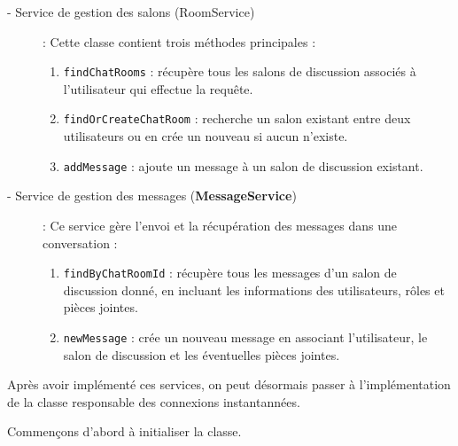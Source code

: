 \begin{description}
    \item[- Service de gestion des salons (RoomService)] : Cette classe contient trois méthodes principales :
        \begin{enumerate}
            \item \verb|findChatRooms| : récupère tous les salons de discussion associés à l'utilisateur qui effectue la requête.
            \item \verb|findOrCreateChatRoom| : recherche un salon existant entre deux utilisateurs ou en crée un nouveau si aucun n'existe.
            \item \verb|addMessage| : ajoute un message à un salon de discussion existant.
        \end{enumerate}
        
    \item[- Service de gestion des messages (\textbf{MessageService})] : Ce service gère l'envoi et la récupération des messages dans une conversation :
        \begin{enumerate}
            \item \verb|findByChatRoomId| : récupère tous les messages d'un salon de discussion donné, en incluant les informations des utilisateurs, rôles et pièces jointes.
            \item \verb|newMessage| : crée un nouveau message en associant l'utilisateur, le salon de discussion et les éventuelles pièces jointes.
        \end{enumerate}
\end{description}

\vspace{0.35cm}

Après avoir implémenté ces services, on peut désormais passer à l'implémentation de la classe responsable des connexions instantannées. 

\vspace{0.35cm}

Commençons d'abord à initialiser la classe. 

\clearpage

